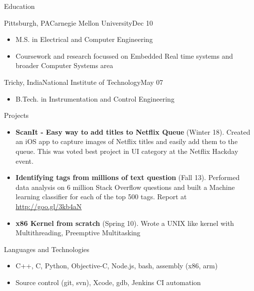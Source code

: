 \documentclass[]{mcdowellcv}
\begin{document}
	\begin{cvsection}{Education}
		\begin{cvsubsection}{Pittsburgh, PA}{Carnegie Mellon University}{Dec 10}
			\begin{itemize}
				\item M.S. in Electrical and Computer Engineering
				\item Coursework and research focussed on Embedded Real time systems and broader Computer Systems area
			\end{itemize}
		\end{cvsubsection}
		\begin{cvsubsection}{Trichy, India}{National Institute of Technology}{May 07}
			\begin{itemize}
				\item B.Tech. in Instrumentation and Control Engineering
			\end{itemize}
		\end{cvsubsection}
	\end{cvsection}

	\begin{cvsection}{Projects}
		\begin{cvsubsection}{}{}{}	
			\begin{itemize}
				\item \textbf{ScanIt - Easy way to add titles to Netflix Queue} (Winter 18). Created an iOS app to capture images of Netflix titles and easily add them to the queue. This was voted best project in UI category at the Netflix Hackday event.   
				\item \textbf{Identifying tags from millions of text question} (Fall 13). Performed data analysis on 6 million Stack Overflow questions and built a Machine learning classifier for  each of the top 500 tags. Report at \url{http://goo.gl/3kb4aN}
				\item \textbf{x86 Kernel from scratch} (Spring 10).  Wrote a UNIX like kernel with Multithreading, Preemptive Multitasking
			\end{itemize}
		\end{cvsubsection}
	\end{cvsection}
	
	\begin{cvsection}{Languages and Technologies}
		\begin{cvsubsection}{}{}{}	
			\begin{itemize}
				\item C++, C, Python, Objective-C, Node.js, bash, assembly (x86, arm)
				\item Source control (git, svn), Xcode, gdb, Jenkins CI automation
			\end{itemize}
		\end{cvsubsection}
	\end{cvsection}
	
\end{document}
